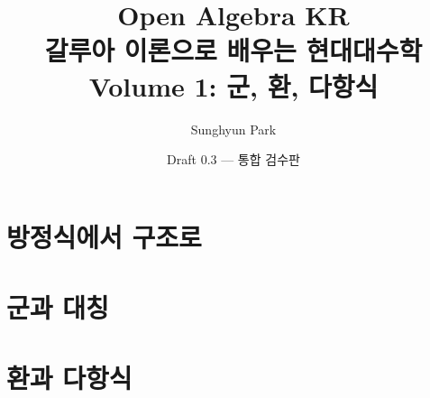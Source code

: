 \documentclass[11pt,openany]{book}
\title{\Huge Open Algebra KR\\[8pt]\Large 갈루아 이론으로 배우는 현대대수학\\[18pt]\large Volume 1: 군, 환, 다항식}
\author{Sunghyun Park}
\date{Draft 0.3 --- 통합 검수판}
\theoremstyle{definition}
\theoremstyle{remark}
\begin{document}
\frontmatter
\maketitle

\tableofcontents


\mainmatter
\part{방정식에서 구조로}
\setcounter{chapter}{-1}


\part{군과 대칭}


\part{환과 다항식}



\backmatter



\end{document}
